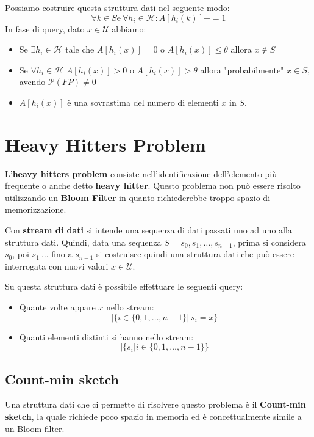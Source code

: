 Possiamo costruire questa struttura dati nel seguente modo:
\begin{equation}
    \forall k \in S \text{e} \ \forall h_i \in \mathcal{H}: A[h_i(k)] += 1
\end{equation}
In fase di query, dato $x \in \mathcal{U}$ abbiamo:
\begin{itemize}
    \item Se $\exists h_i \in \mathcal{H}$ tale che $A[h_i(x)] = 0$ o
          $A[h_i(x)] \leq \theta$ allora $x \notin S$
    \item Se $\forall h_i \in \mathcal{H}$ $A[h_i(x)] > 0$ o $A[h_i(x)] > \theta$
          allora "probabilmente" $x \in S$, avendo $\mathcal{P}(FP) \neq 0$
    \item $A[h_i(x)]$ è una sovrastima del numero di elementi $x$ in $S$.
\end{itemize}
\section{Heavy Hitters Problem}
L'\textbf{heavy hitters problem} consiste nell'identificazione dell'elemento più
frequente o anche detto \textbf{heavy hitter}. Questo problema non può essere
risolto utilizzando un \textbf{Bloom Filter} in quanto richiederebbe troppo spazio
di memorizzazione.
\begin{definizione}
    Con \textbf{stream di dati} si intende una sequenza di dati passati uno ad
    uno alla struttura dati. Quindi, data una sequenza $S = s_0,s_1, \dots ,s_{n-1}$,
    prima si considera $s_0$, poi $s_1 \ \dots$ fino a $s_{n-1}$ si costruisce
    quindi una struttura dati che può essere interrogata con nuovi valori
    $x \in \mathcal{U}$.
\end{definizione}
Su questa struttura dati è possibile effettuare le seguenti query:
\begin{itemize}
    \item Quante volte appare $x$ nello stream:
          \begin{equation}
              | \{ i \in \{0, 1, \dots, n - 1\}| \ s_i = x \}|
          \end{equation}
    \item Quanti elementi distinti si hanno nello stream:
          \begin{equation}
              |\{s_i | i \in \{0, 1, \dots, n - 1\}\}|
          \end{equation}
\end{itemize}
\subsection{Count-min sketch}
Una struttura dati che ci permette di risolvere questo problema è il
\textbf{Count-min sketch}, la quale richiede poco spazio in memoria ed è
concettualmente simile a un Bloom filter.

